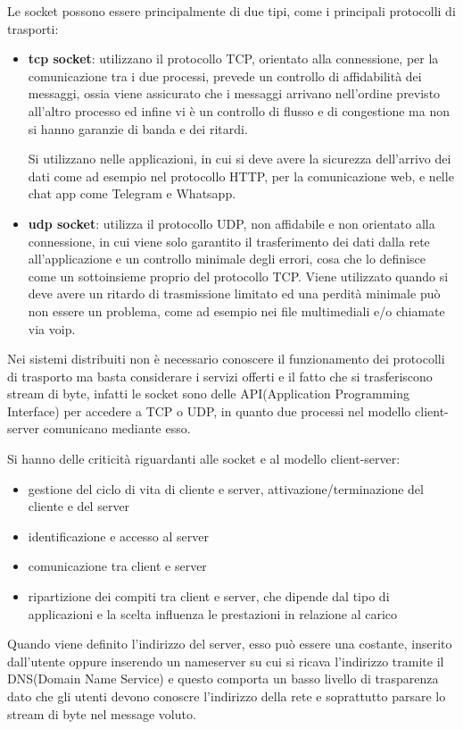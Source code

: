 \message{ !name(sd.tex)}\documentclass[a4paper,12pt, oneside]{book}
\begin{document}
Le socket possono essere principalmente di due tipi, come i principali protocolli di trasporti:
\begin{itemize}
    \item \textbf{tcp socket}: utilizzano il protocollo TCP, orientato alla connessione,
        per la comunicazione tra i due processi, prevede un controllo di affidabilità dei messaggi,
        ossia viene assicurato che i messaggi arrivano nell'ordine previsto all'altro processo
        ed infine vi è un controllo di flusso e di congestione ma non si hanno garanzie di banda e dei ritardi.

        Si utilizzano nelle applicazioni, in cui si deve avere la sicurezza dell'arrivo dei dati come ad
        esempio nel protocollo HTTP, per la comunicazione web, e nelle chat app come Telegram e Whatsapp.

    \item \textbf{udp socket}: utilizza il protocollo UDP, non affidabile e non orientato alla connessione,
        in cui viene solo garantito il trasferimento dei dati dalla rete all'applicazione e un controllo 
        minimale degli errori, cosa che lo definisce come un sottoinsieme proprio del protocollo TCP.\newline
        Viene utilizzato quando si deve avere un ritardo di trasmissione limitato ed una perdità minimale
        può non essere un problema, come ad esempio nei file multimediali e/o chiamate via voip.
\end{itemize}
Nei sistemi distribuiti non è necessario conoscere il funzionamento dei protocolli di trasporto ma basta
considerare i servizi offerti e il fatto che si trasferiscono stream di byte, infatti
le socket sono delle API(Application Programming Interface) per accedere a TCP o UDP, in quanto due processi
nel modello client-server comunicano mediante esso.

Si hanno delle criticità riguardanti alle socket e al modello client-server:
\begin{itemize}
    \item gestione del ciclo di vita di cliente e server, attivazione/terminazione del cliente e del server
    \item identificazione e accesso al server
    \item comunicazione tra client e server
    \item ripartizione dei compiti tra client e server, che dipende dal tipo di applicazioni 
          e la scelta influenza le prestazioni in relazione al carico
\end{itemize}
Quando viene definito l'indirizzo del server, esso può essere una costante, inserito dall'utente oppure
inserendo un nameserver su cui si ricava l'indirizzo tramite il DNS(Domain Name Service) e questo comporta 
un basso livello di trasparenza dato che gli utenti devono conoscre l'indirizzo della rete e soprattutto 
parsare lo stream di byte nel message voluto.
\end{document}
